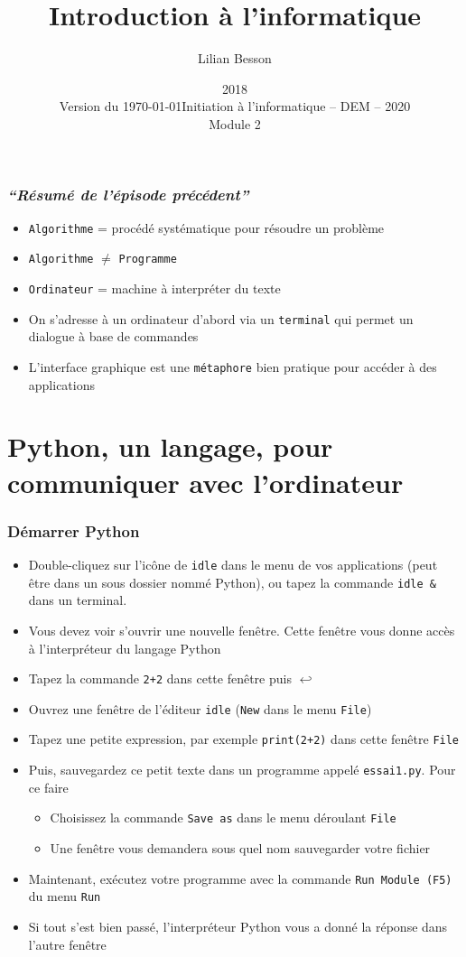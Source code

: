 \documentclass{beamer}
\title{Introduction à l'informatique}
\author{Lilian Besson}
\date{2018\\Version du \today}
\institute%
{ENS Rennes}
\date%
[Info - DEM - 2020]{Initiation à l'informatique -- DEM -- 2020\\Module 2}%
\newcommand{\mypause}{\pause}
\newcommand{\alalign}{{$\hookleftarrow$}}
\newcommand{\pyth}{{\sc Python}}
\newcommand{\prog}[1]{\alert{\texttt{#1}}}
\begin{document}
\frame{\titlepage}

\section[Outline]{}
\frame{\tableofcontents}

\frame
{
\frametitle{\emph{``Résumé de l'épisode précédent''}}
{
  \begin{itemize}
  \item \prog{Algorithme} = procédé systématique pour résoudre un problème \mypause{}
  \item \prog{Algorithme} $\not = $ \prog{Programme}\mypause{}
  \item \prog{Ordinateur} = machine à interpréter du texte\mypause{}
  \item On s'adresse à un ordinateur d'abord via un \prog{terminal} qui permet
un dialogue à base de commandes\mypause{}
  \item L'interface graphique est une \prog{métaphore} bien pratique pour
accéder à des applications
  \end{itemize}
}
}

\section{\pyth{}, un langage, pour communiquer avec l'ordinateur}

\frame
{
\frametitle{Démarrer Python}
{\footnotesize
\begin{itemize}
\item Double-cliquez sur l'icône de \prog{idle} dans le menu de vos applications (peut être dans un sous dossier nommé Python), ou tapez la commande \prog{idle \&} dans un terminal.\mypause{}
\item Vous devez voir s'ouvrir une nouvelle fenêtre. Cette fenêtre vous donne accès à l'interpréteur
du langage \pyth{} \mypause{}
\item Tapez la commande \texttt{\prog{2+2}} dans cette fenêtre puis \alalign{}\mypause{}
\item Ouvrez une fenêtre de l'éditeur \prog{idle} (\prog{New} dans le menu \prog{File})\mypause{}
\item Tapez une petite expression, par exemple \prog{print(2+2)} dans cette fenêtre \prog{File} \mypause{}
\item Puis, sauvegardez ce petit texte dans un programme appelé \prog{essai1.py}. Pour ce faire\mypause{}
\begin{itemize}
\item Choisissez la commande \prog{Save as} dans le menu déroulant \prog{File}
\item Une fenêtre vous demandera sous quel nom sauvegarder votre fichier\mypause{}
\end{itemize}\mypause{}
\item Maintenant, exécutez votre programme avec la commande \prog{Run Module (F5)} du menu
\prog{Run}\mypause{}
\item Si tout s'est bien passé, l'interpréteur \pyth{} vous a donné la réponse dans l'autre fenêtre
\end{itemize}
}
}
\end{document}
